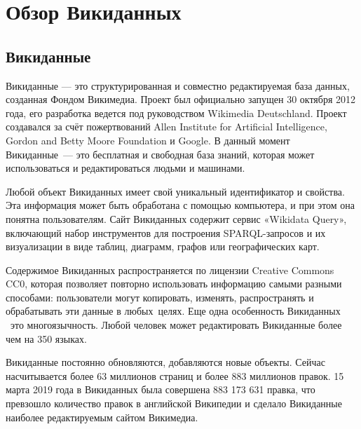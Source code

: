 \chapter{Обзор Викиданных}
\label{ch:ReviewAboutWD}

\section{Викиданные}
Викиданные — это структурированная и совместно редактируемая база данных, созданная Фондом Викимедиа. Проект был официально запущен 30 октября 2012 года, его разработка ведется под руководством Wikimedia Deutschland\cite{Wikidata_review}. Проект создавался за счёт пожертвований Allen Institute for Artificial Intelligence, Gordon and Betty Moore Foundation и Google. В данный момент Викиданные — это бесплатная и свободная база знаний, которая может использоваться и редактироваться людьми и машинами\cite{Vrandecic}.

Любой объект Викиданных имеет свой уникальный идентификатор и свойства. Эта информация может быть обработана с помощью компьютера, и при этом она понятна пользователям. Сайт Викиданных содержит сервис «Wikidata Query», включающий набор инструментов для построения SPARQL-запросов и их визуализации в виде таблиц, диаграмм, графов или географических карт.

Содержимое Викиданных распространяется по лицензии Creative Commons CC0, которая позволяет повторно использовать информацию самыми разными способами: пользователи могут копировать, изменять, распространять и обрабатывать эти данные в любых целях. Еще одна особенность Викиданных  это многоязычность. Любой человек может редактировать Викиданные более чем на 350 языках.

Викиданные постоянно обновляются, добавляются новые объекты. Сейчас насчитывается более 63 миллионов страниц и более 883 миллионов правок. 15 марта 2019 года в Викиданных была совершена 883 173 631 правка, что превзошло количество правок в английской Википедии и сделало Викиданные наиболее редактируемым сайтом Викимедиа\cite{Wikipedia_review}.